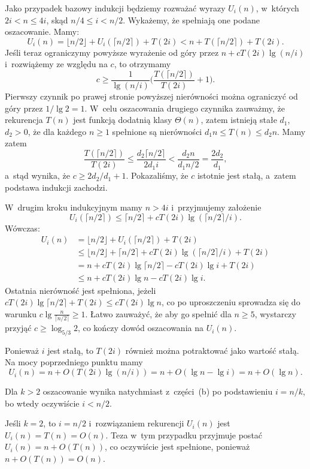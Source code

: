 Jako przypadek bazowy indukcji będziemy rozważać wyrazy $U_i(n)$, w~których $2i<n\le4i$, skąd $n/4\le i<n/2$. Wykażemy, że spełniają one podane oszacowanie. Mamy:
\[
    U_i(n) = \lfloor n/2\rfloor+U_i(\lceil n/2\rceil)+T(2i) < n+T(\lceil n/2\rceil)+T(2i).
\]
Jeśli teraz ograniczymy powyższe wyrażenie od góry przez $n+cT(2i)\lg(n/i)$ i~rozwiążemy ze względu na $c$, to otrzymamy
\[
    c \ge \frac{1}{\lg(n/i)}\biggl(\frac{T(\lceil n/2\rceil)}{T(2i)}+1\biggr).
\]
Pierwszy czynnik po prawej stronie powyższej nierówności można ograniczyć od góry przez $1/\lg2=1$. W~celu oszacowania drugiego czynnika zauważmy, że rekurencja $T(n)$ jest funkcją dodatnią klasy $\Theta(n)$, zatem istnieją stałe $d_1$, $d_2>0$, że dla każdego $n\ge1$ spełnione są nierówności $d_1n\le T(n)\le d_2n$. Mamy zatem
\[
    \frac{T(\lceil n/2\rceil)}{T(2i)} \le \frac{d_2\lceil n/2\rceil}{2d_1i} < \frac{d_2n}{d_1n/2} = \frac{2d_2}{d_1},
\]
a~stąd wynika, że $c\ge2d_2/d_1+1$. Pokazaliśmy, że $c$ istotnie jest stałą, a~zatem podstawa indukcji zachodzi.

W~drugim kroku indukcyjnym mamy $n>4i$ i~przyjmujemy założenie
\[
    U_i(\lceil n/2\rceil) \le \lceil n/2\rceil+cT(2i)\lg(\lceil n/2\rceil/i).
\]
Wówczas:
\begin{align*}
    U_i(n) &= \lfloor n/2\rfloor+U_i(\lceil n/2\rceil)+T(2i) \\
	&\le \lfloor n/2\rfloor+\lceil n/2\rceil+cT(2i)\lg(\lceil n/2\rceil/i)+T(2i) \\
	&= n+cT(2i)\lg\lceil n/2\rceil-cT(2i)\lg i+T(2i) \\
	&\le n+cT(2i)\lg n-cT(2i)\lg i.
\end{align*}
Ostatnia nierówność jest spełniona, jeżeli $cT(2i)\lg\lceil n/2\rceil+T(2i)\le cT(2i)\lg n$, co po uproszczeniu sprowadza się do warunku $c\lg\frac{n}{\lceil n/2\rceil}\ge1$. Łatwo zauważyć, że aby go spełnić dla $n\ge5$, wystarczy przyjąć $c\ge\log_{5/3}2$, co kończy dowód oszacowania na $U_i(n)$.

\subproblem %
Ponieważ $i$ jest stałą, to $T(2i)$ również można potraktować jako wartość stałą. Na mocy poprzedniego punktu mamy
\[
	U_i(n) = n+O(T(2i)\lg(n/i)) = n+O(\lg n-\lg i) = n+O(\lg n).
\]

\subproblem %
Dla $k>2$ oszacowanie wynika natychmiast z~części~(b) po podstawieniu $i=n/k$, bo wtedy oczywiście $i<n/2$.

Jeśli $k=2$, to $i=n/2$ i~rozwiązaniem rekurencji $U_i(n)$ jest $U_i(n)=T(n)=O(n)$. Teza w~tym przypadku przyjmuje postać $U_i(n)=n+O(T(n))$, co oczywiście jest spełnione, ponieważ $n+O(T(n))=O(n)$.

\endinput